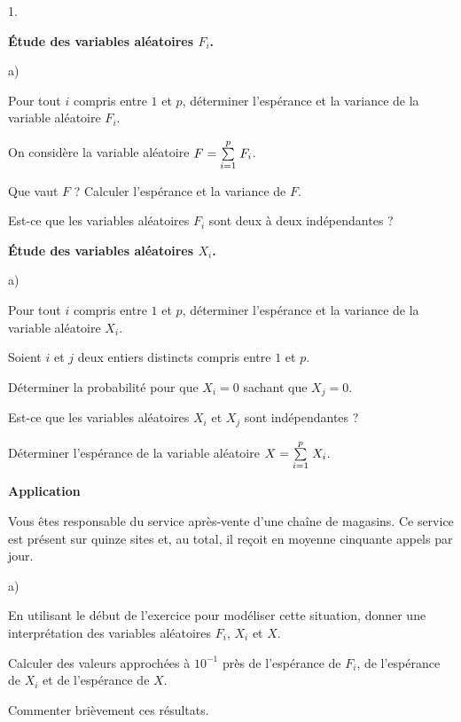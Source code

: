 \documentclass[11pt]{article}%
\begin{document}
\begin{noliste}{1.}
 \setlength{\itemsep}{4mm}
\item \textbf{Étude des variables aléatoires $F_{i}$.}

\begin{noliste}{a)}
 \setlength{\itemsep}{2mm}
\item Pour tout $i$ compris entre $1$ et $p$, déterminer l'espérance et
la variance de la variable aléatoire $F_{i}$.

\item On considère la variable aléatoire $F = {\textstyle\sum\limits_{i = 1}^{p}}\hspace{.1cm}F_{i}$.

Que vaut $F$ ? Calculer l'espérance et la variance de $F$.

\item Est-ce que les variables aléatoires $F_{i}$ sont deux à deux
indépendantes ?
\end{noliste}

\item \textbf{Étude des variables aléatoires $X_{i}$.}

\begin{noliste}{a)}
 \setlength{\itemsep}{2mm}
\item Pour tout $i$ compris entre $1$ et $p$, déterminer l'espérance et
la variance de la variable aléatoire $X_{i}$.

\item Soient $i$ et $j$ deux entiers distincts compris entre $1$ et
$p$.

Déterminer la probabilité pour que $X_{i} = 0$ sachant que $X_{j} = 0$.

Est-ce que les variables aléatoires $X_{i}$ et $X_{j}$ sont
indépendantes ?

\item Déterminer l'espérance de la variable aléatoire $X = {\textstyle\sum\limits_{i =
1}^{p}}\hspace{.1cm}X_{i}$.
\end{noliste}

\item \textbf{Application}

Vous êtes responsable du service après-vente d'une chaîne de magasins.
Ce service est présent sur quinze sites et, au total, il reçoit en
moyenne
cinquante appels par jour.

\begin{noliste}{a)}
 \setlength{\itemsep}{2mm}
\item En utilisant le début de l'exercice pour modéliser cette
situation, donner une interprétation des variables aléatoires $F_{i}$,
$X_{i} $ et $X$.

\item Calculer des valeurs approchées à $10^{-1}$ près de
l'espérance de $F_{i}$, de l'espérance de $X_{i}$ et de l'espérance de
$X$.

Commenter brièvement ces résultats.
\end{noliste}
\end{noliste}
\end{document}
